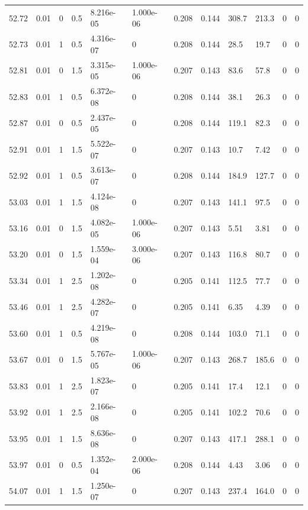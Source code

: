 \documentclass[preview]{standalone}
\begin{document}
{{{{{{{{{{{{{{{{{\begin{tabular}{L{1.2cm}C{1.2cm} C{0.3cm}C{0.5cm} C{1.4cm}C{1.4cm} C{1.4cm}C{1.4cm} C{1.6cm}C{1.6cm} C{1.6cm}C{1.6cm}}
  52.72  &  0.01  & 0     & 0.5 &  8.216e-05  & 1.000e-06  &  0.208&   0.144& 308.7 & 213.3   &  0 & 0  \\ 
  52.73  &  0.01  & 1     & 0.5 &  4.316e-07  & 0  &  0.208&   0.144& 28.5 & 19.7   &  0 & 0  \\ 
  52.81  &  0.01  & 0     & 1.5 &  3.315e-05  & 1.000e-06  &  0.207&   0.143& 83.6 & 57.8   &  0 & 0  \\ 
  52.83  &  0.01  & 1     & 0.5 &  6.372e-08  & 0  &  0.208&   0.144& 38.1 & 26.3   &  0 & 0  \\ 
  52.87  &  0.01  & 0     & 0.5 &  2.437e-05  & 0  &  0.208&   0.144& 119.1 & 82.3   &  0 & 0  \\ 
  52.91  &  0.01  & 1     & 1.5 &  5.522e-07  & 0  &  0.207&   0.143& 10.7 & 7.42   &  0 & 0  \\ 
  52.92  &  0.01  & 1     & 0.5 &  3.613e-07  & 0  &  0.208&   0.144& 184.9 & 127.7   &  0 & 0  \\ 
  53.03  &  0.01  & 1     & 1.5 &  4.124e-08  & 0  &  0.207&   0.143& 141.1 & 97.5   &  0 & 0  \\ 
  53.16  &  0.01  & 0     & 1.5 &  4.082e-05  & 1.000e-06  &  0.207&   0.143& 5.51 & 3.81   &  0 & 0  \\ 
  53.20  &  0.01  & 0     & 1.5 &  1.559e-04  & 3.000e-06  &  0.207&   0.143& 116.8 & 80.7   &  0 & 0  \\ 
  53.34  &  0.01  & 1     & 2.5 &  1.202e-08  & 0  &  0.205&   0.141& 112.5 & 77.7   &  0 & 0  \\ 
  53.46  &  0.01  & 1     & 2.5 &  4.282e-07  & 0  &  0.205&   0.141& 6.35 & 4.39   &  0 & 0  \\ 
  53.60  &  0.01  & 1     & 0.5 &  4.219e-08  & 0  &  0.208&   0.144& 103.0 & 71.1   &  0 & 0  \\ 
  53.67  &  0.01  & 0     & 1.5 &  5.767e-05  & 1.000e-06  &  0.207&   0.143& 268.7 & 185.6   &  0 & 0  \\ 
  53.83  &  0.01  & 1     & 2.5 &  1.823e-07  & 0  &  0.205&   0.141& 17.4 & 12.1   &  0 & 0  \\ 
  53.92  &  0.01  & 1     & 2.5 &  2.166e-08  & 0  &  0.205&   0.141& 102.2 & 70.6   &  0 & 0  \\ 
  53.95  &  0.01  & 1     & 1.5 &  8.636e-08  & 0  &  0.207&   0.143& 417.1 & 288.1   &  0 & 0  \\ 
  53.97  &  0.01  & 0     & 0.5 &  1.352e-04  & 2.000e-06  &  0.208&   0.144& 4.43 & 3.06   &  0 & 0  \\ 
  54.07  &  0.01  & 1     & 1.5 &  1.250e-07  & 0  &  0.207&   0.143& 237.4 & 164.0   &  0 & 0  \\ 

\end{tabular}}}}}}}}}}}}}}}}}}
\end{document}
